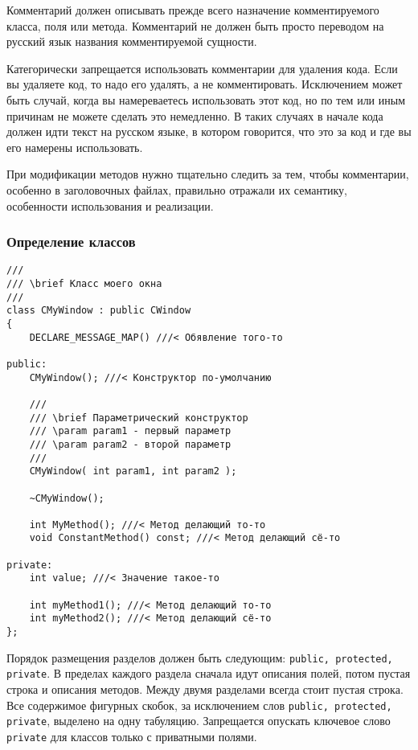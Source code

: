 Комментарий должен описывать прежде всего назначение комментируемого класса, поля или метода. Комментарий не должен быть просто переводом на русский язык названия комментируемой сущности.


Категорически запрещается использовать комментарии для удаления кода. Если вы удаляете код, то надо его удалять, а не комментировать. Исключением может быть случай, когда вы намереваетесь использовать этот код, но по тем или иным причинам не можете сделать это немедленно. В таких случаях в начале кода должен идти текст на русском языке, в котором говорится, что это за код и где вы его намерены использовать.

При модификации методов нужно тщательно следить за тем, чтобы комментарии, особенно в заголовочных файлах, правильно отражали их семантику, особенности использования и реализации.

\subsubsection{Определение классов}

\begin{lstlisting}[frame=single]
///
/// \brief Класс моего окна
///
class СMyWindow : public CWindow 
{
    DECLARE_MESSAGE_MAP() ///< Обявление того-то
	
public:
    CMyWindow(); ///< Конструктор по-умолчанию
	
    ///
    /// \brief Параметрический конструктор
    /// \param param1 - первый параметр
    /// \param param2 - второй параметр
    ///	
    СMyWindow( int param1, int param2 );
	
    ~СMyWindow();
	
    int MyMethod(); ///< Метод делающий то-то
    void ConstantMethod() const; ///< Метод делающий сё-то
	
private:
    int value; ///< Значение такое-то
    
    int myMethod1(); ///< Метод делающий то-то
    int myMethod2(); ///< Метод делающий сё-то
};
\end{lstlisting}

Порядок размещения разделов должен быть следующим: \lstinline|public, protected, private|. В пределах каждого раздела сначала идут описания полей, потом пустая строка и описания методов. Между двумя разделами всегда стоит пустая строка. Все содержимое фигурных скобок, за исключением слов \lstinline|public, protected, private|, выделено на одну табуляцию. 
Запрещается опускать ключевое слово \lstinline|private| для классов только с приватными полями.

